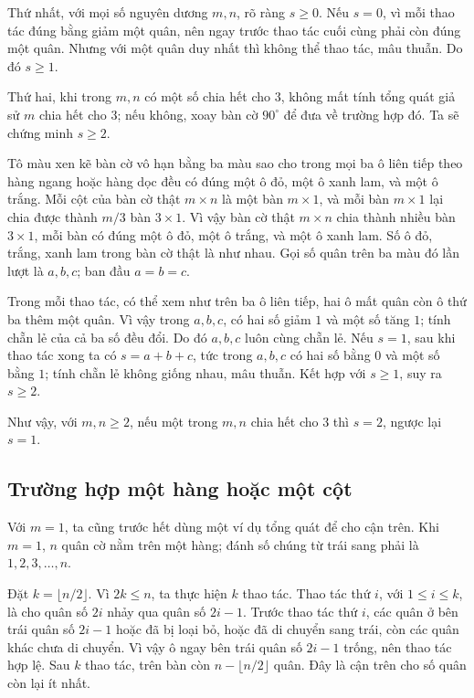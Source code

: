 \documentclass[11pt]{article}
\begin{document}
Thứ nhất, với mọi số nguyên dương \(m,n\), rõ ràng \(s\ge 0\). Nếu \(s=0\), vì
mỗi thao tác đúng bằng giảm một quân, nên ngay trước thao tác cuối cùng phải
còn đúng một quân. Nhưng với một quân duy nhất thì không thể thao tác, mâu
thuẫn. Do đó \(s\ge 1\).

Thứ hai, khi trong \(m,n\) có một số chia hết cho \(3\), không mất tính tổng
quát giả sử \(m\) chia hết cho \(3\); nếu không, xoay bàn cờ \(90^\circ\) để
đưa về trường hợp đó. Ta sẽ chứng minh \(s\ge 2\).

Tô màu xen kẽ bàn cờ vô hạn bằng ba màu sao cho trong mọi ba ô liên tiếp theo
hàng ngang hoặc hàng dọc đều có đúng một ô đỏ, một ô xanh lam, và một ô trắng.
Mỗi cột của bàn cờ thật \(m\times n\) là một bàn \(m\times 1\), và mỗi bàn
\(m\times 1\) lại chia được thành \(m/3\) bàn \(3\times 1\). Vì vậy bàn cờ
thật \(m\times n\) chia thành nhiều bàn \(3\times 1\), mỗi bàn có đúng một ô
đỏ, một ô trắng, và một ô xanh lam. Số ô đỏ, trắng, xanh lam trong bàn cờ thật
là như nhau. Gọi số quân trên ba màu đó lần lượt là \(a,b,c\); ban đầu
\(a=b=c\).

Trong mỗi thao tác, có thể xem như trên ba ô liên tiếp, hai ô mất quân còn ô
thứ ba thêm một quân. Vì vậy trong \(a,b,c\), có hai số giảm \(1\) và một số
tăng \(1\); tính chẵn lẻ của cả ba số đều đổi. Do đó \(a,b,c\) luôn cùng chẵn
lẻ. Nếu \(s=1\), sau khi thao tác xong ta có \(s=a+b+c\), tức trong
\(a,b,c\) có hai số bằng \(0\) và một số bằng \(1\); tính chẵn lẻ không giống
nhau, mâu thuẫn. Kết hợp với \(s\ge 1\), suy ra \(s\ge 2\).

Như vậy, với \(m,n\ge 2\), nếu một trong \(m,n\) chia hết cho \(3\) thì
\(s=2\), ngược lại \(s=1\).

\subsection{Trường hợp một hàng hoặc một cột}

Với \(m=1\), ta cũng trước hết dùng một ví dụ tổng quát để cho cận trên. Khi
\(m=1\), \(n\) quân cờ nằm trên một hàng; đánh số chúng từ trái sang phải là
\(1,2,3,\ldots,n\).

Đặt \(k=\lfloor n/2\rfloor\). Vì \(2k\le n\), ta thực hiện \(k\) thao tác.
Thao tác thứ \(i\), với \(1\le i\le k\), là cho quân số \(2i\) nhảy qua quân
số \(2i-1\). Trước thao tác thứ \(i\), các quân ở bên trái quân số \(2i-1\)
hoặc đã bị loại bỏ, hoặc đã di chuyển sang trái, còn các quân khác chưa di
chuyển. Vì vậy ô ngay bên trái quân số \(2i-1\) trống, nên thao tác hợp lệ.
Sau \(k\) thao tác, trên bàn còn \(n-\lfloor n/2\rfloor\) quân. Đây là cận
trên cho số quân còn lại ít nhất.
\end{document}
